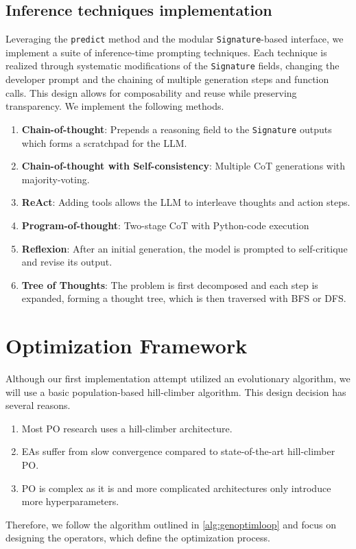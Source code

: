 \subsection{Inference techniques implementation}
Leveraging the \texttt{predict} method and the modular \texttt{Signature}-based interface, we implement a suite of inference-time prompting techniques. 
Each technique is realized through systematic modifications of the \texttt{Signature} fields, changing the developer prompt and the chaining of multiple generation steps 
and function calls. This design allows for composability and reuse while preserving transparency.
We implement the following methods.
\begin{enumerate}
    \item \textbf{Chain-of-thought}\cite{NEURIPS2022_8bb0d291}: Prepends a reasoning field to the \texttt{Signature} outputs which forms a scratchpad for the LLM.
    \item \textbf{Chain-of-thought with Self-consistency}\cite{wang2023selfconsistencyimproveschainthought}: Multiple CoT generations with majority-voting.
    \item \textbf{ReAct}\cite{yao2023reactsynergizingreasoningacting}: Adding tools allows the LLM to interleave thoughts and action steps.
    \item \textbf{Program-of-thought}\cite{chen2023programthoughtspromptingdisentangling}: Two-stage CoT with Python-code execution
    \item \textbf{Reflexion}\cite{shinn2023reflexionlanguageagentsverbal}: After an initial generation, the model is prompted to self-critique and revise its output.
    \item \textbf{Tree of Thoughts}\cite{yao2023treethoughtsdeliberateproblem}: The problem is first decomposed and each step is expanded, forming a thought tree, which is then traversed with BFS or DFS.
\end{enumerate}

\section{Optimization Framework}
Although our first implementation attempt utilized an evolutionary algorithm, we will use a basic population-based hill-climber algorithm.
This design decision has several reasons.
\begin{enumerate}
    \item Most PO research uses a hill-climber architecture.
    \item EAs suffer from slow convergence compared to state-of-the-art hill-climber PO.
    \item PO is complex as it is and more complicated architectures only introduce more hyperparameters.
\end{enumerate}
Therefore, we follow the algorithm outlined in \ref{alg:genoptimloop} and focus on designing the operators, which define
the optimization process. 
